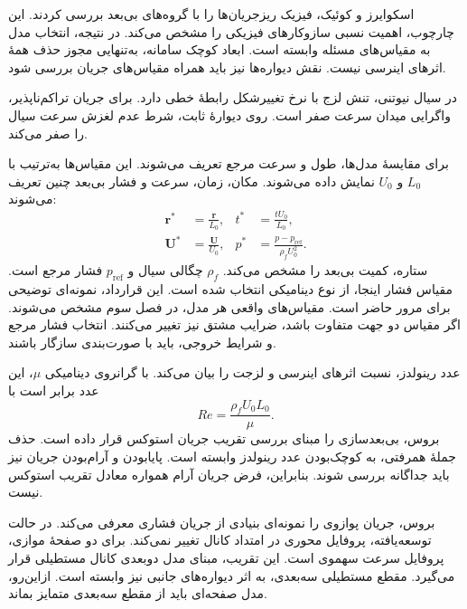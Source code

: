 \label{sec:lit-channel-flow}

اسکوایرز و کوئیک، فیزیک ریزجریان‌ها را با گروه‌های بی‌بعد بررسی کردند.
این چارچوب، اهمیت نسبی سازوکارهای فیزیکی را مشخص می‌کند.
در نتیجه، انتخاب مدل به مقیاس‌های مسئله وابسته است.
ابعاد کوچک سامانه، به‌تنهایی مجوز حذف همهٔ اثرهای اینرسی نیست.
نقش دیواره‌ها نیز باید همراه مقیاس‌های جریان بررسی شود.
\cite{SquiresQuake2005}

در سیال نیوتنی، تنش لزج با نرخ تغییرشکل رابطهٔ خطی دارد.
برای جریان تراکم‌ناپذیر، واگرایی میدان سرعت صفر است.
روی دیوارهٔ ثابت، شرط عدم لغزش سرعت سیال را صفر می‌کند.
\cite{SquiresQuake2005}

برای مقایسهٔ مدل‌ها، طول و سرعت مرجع تعریف می‌شوند.
این مقیاس‌ها به‌ترتیب با $L_0$ و $U_0$ نمایش داده می‌شوند.
مکان، زمان، سرعت و فشار بی‌بعد چنین تعریف می‌شوند:
\begin{equation}
\begin{aligned}
\mathbf r^*&=\frac{\mathbf r}{L_0},&
t^*&=\frac{tU_0}{L_0},\\
\mathbf U^*&=\frac{\mathbf U}{U_0},&
p^*&=\frac{p-p_{\mathrm{ref}}}{\rho_f U_0^2}.
\end{aligned}
\label{eq:lit-reference-scales}
\end{equation}
ستاره، کمیت بی‌بعد را مشخص می‌کند.
$\rho_f$ چگالی سیال و $p_{\mathrm{ref}}$ فشار مرجع است.
مقیاس فشار اینجا، از نوع دینامیکی انتخاب شده است.
این قرارداد، نمونه‌ای توضیحی برای مرور حاضر است.
مقیاس‌های واقعی هر مدل، در فصل سوم مشخص می‌شوند.
اگر مقیاس دو جهت متفاوت باشد، ضرایب مشتق نیز تغییر می‌کنند.
انتخاب فشار مرجع و شرایط خروجی، باید با صورت‌بندی سازگار باشند.

عدد رینولدز، نسبت اثرهای اینرسی و لزجت را بیان می‌کند.
با گرانروی دینامیکی $\mu$، این عدد برابر است با
\begin{equation}
Re=\frac{\rho_f U_0L_0}{\mu}.
\label{eq:lit-reynolds-number}
\end{equation}
بروس، بی‌بعدسازی را مبنای بررسی تقریب جریان استوکس قرار داده است.
حذف جملهٔ همرفتی، به کوچک‌بودن عدد رینولدز وابسته است.
پایابودن و آرام‌بودن جریان نیز باید جداگانه بررسی شوند.
بنابراین، فرض جریان آرام همواره معادل تقریب استوکس نیست.
\cite{Bruus2014Governing}

بروس، جریان پوازوی را نمونه‌ای بنیادی از جریان فشاری معرفی می‌کند.
در حالت توسعه‌یافته، پروفایل محوری در امتداد کانال تغییر نمی‌کند.
برای دو صفحهٔ موازی، پروفایل سرعت سهموی است.
این تقریب، مبنای مدل دوبعدی کانال مستطیلی قرار می‌گیرد.
مقطع مستطیلی سه‌بعدی، به اثر دیواره‌های جانبی نیز وابسته است.
ازاین‌رو، مدل صفحه‌ای باید از مقطع سه‌بعدی متمایز بماند.
\cite{Bruus2014Governing}

